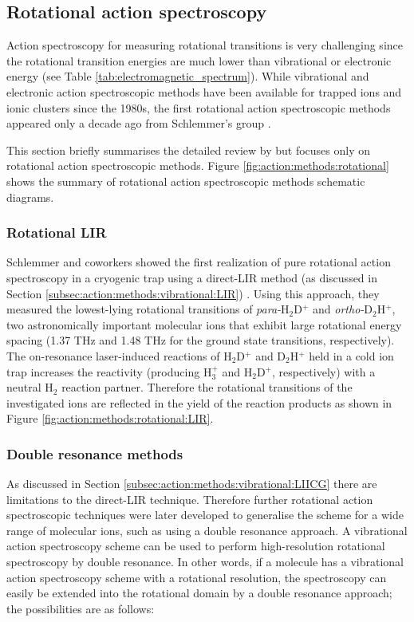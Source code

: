 \subsection{Rotational action spectroscopy}
\label{subsec:action:methods:rotational}

Action spectroscopy for measuring rotational transitions is very challenging
since the rotational transition energies are much lower than vibrational or
electronic energy (see Table \ref{tab:electromagnetic_spectrum}). While
vibrational and electronic action spectroscopic methods have been available for
trapped ions and ionic clusters since the 1980s, the first rotational action
spectroscopic methods appeared only a decade ago from Schlemmer's group
\cite{Asvany2008}.

This section briefly summarises the detailed review by
\citet{Asvany2021} but focuses only on rotational action spectroscopic methods.
Figure \ref{fig:action:methods:rotational} shows the summary of rotational
action spectroscopic methods schematic diagrams.

\subsubsection{Rotational LIR}
\label{subsec:rotational-LIR}

Schlemmer and coworkers showed the first realization of pure rotational action
spectroscopy in a cryogenic trap using a direct-LIR method (as discussed in
Section \ref{subsec:action:methods:vibrational:LIR}) \cite{Asvany2008}. Using
this approach, they measured the lowest-lying rotational transitions of 
\emph{para-}H$_2$D$^+$ and \emph{ortho-}D$_2$H$^+$, two astronomically
important molecular ions that exhibit large rotational energy spacing (1.37 THz
and 1.48 THz for the ground state transitions, respectively). The on-resonance
laser-induced reactions of H$_2$D$^+$ and D$_2$H$^+$ held in a cold ion trap
increases the reactivity (producing H$_3^+$ and H$_2$D$^+$, respectively) with
a neutral H$_2$ reaction partner. Therefore the rotational transitions of the
investigated ions are reflected in the yield of the reaction products as shown
in Figure \ref{fig:action:methods:rotational:LIR}.

\subsubsection{Double resonance methods}
\label{subsec:action:methods:rotational:DR}

As discussed in Section \ref{subsec:action:methods:vibrational:LIICG} there are
limitations to the direct-LIR technique. Therefore further rotational action
spectroscopic techniques were later developed to generalise the scheme for a
wide range of molecular ions, such as using a double resonance approach. A
vibrational action spectroscopy scheme can be used to perform high-resolution
rotational spectroscopy by double resonance. In other words, if a molecule has
a vibrational action spectroscopy scheme with a rotational resolution, the
spectroscopy can easily be extended into the rotational domain by a double
resonance approach; the possibilities are as follows:

